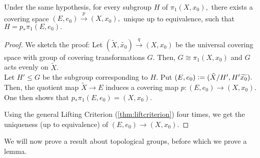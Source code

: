 \documentclass[12pt]{article}
\begin{document}
\begin{cor} \label{cor:galoiscorresp}
	Under the same hypothesis, for every subgroup $H$ of $\pi_1(X, x_0),$ there exists a covering space $(E, e_0) \overset{p}{\longrightarrow} (X, x_0),$ unique up to equivalence, such that $H = p_*\pi_1(E, e_0).$
\end{cor}
\begin{proof} 
	We sketch the proof: Let $(\tilde{X}, \widetilde{x_0})\overset{q}{\longrightarrow}(X, x_0)$ be the universal covering space with group of covering transformations $G.$ Then, $G \cong \pi_1(X, x_0)$ and $G$ acts evenly on $\tilde{X}.$\\
	Let $H' \le G$ be the subgroup corresponding to $H.$ Put $(E, e_0) \vcentcolon= (\tilde{X}/H', H'\widetilde{x_0}).$ Then, the quotient map $\tilde{X}\to E$ induces a covering map $p:(E, e_0) \to (X, x_0).$\\
	One then shows that $p_*\pi_1(E, e_0) = (X, x_0).$	

	Using the general Lifting Criterion (\cref{thm:liftcriterion}) four times, we get the uniqueness (up to equivalence) of $(E, e_0) \to (X, x_0).$
\end{proof}

We will now prove a result about topological groups, before which we prove a lemma.
\end{document}
